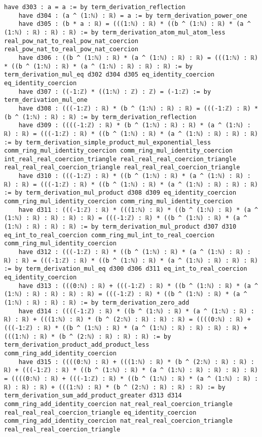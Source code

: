 \documentclass{article}
\begin{document}
\begin{tcolorbox}[colback=white!10, width=\linewidth]
\begin{lstlisting}[language=Lean4]
    have d303 : a = a := by term_derivation_reflection
    have d304 : (a ^ (1:ℕ) : ℝ) = a := by term_derivation_power_one
    have d305 : (b * a : ℝ) = (((1:ℕ) : ℝ) * ((b ^ (1:ℕ) : ℝ) * (a ^ (1:ℕ) : ℝ) : ℝ) : ℝ) := by term_derivation_atom_mul_atom_less real_pow_nat_to_real_pow_nat_coercion real_pow_nat_to_real_pow_nat_coercion
    have d306 : ((b ^ (1:ℕ) : ℝ) * (a ^ (1:ℕ) : ℝ) : ℝ) = (((1:ℕ) : ℝ) * ((b ^ (1:ℕ) : ℝ) * (a ^ (1:ℕ) : ℝ) : ℝ) : ℝ) := by term_derivation_mul_eq d302 d304 d305 eq_identity_coercion eq_identity_coercion
    have d307 : ((-1:ℤ) * ((1:ℕ) : ℤ) : ℤ) = (-1:ℤ) := by term_derivation_mul_one
    have d308 : (((-1:ℤ) : ℝ) * (b ^ (1:ℕ) : ℝ) : ℝ) = (((-1:ℤ) : ℝ) * (b ^ (1:ℕ) : ℝ) : ℝ) := by term_derivation_reflection
    have d309 : ((((-1:ℤ) : ℝ) * (b ^ (1:ℕ) : ℝ) : ℝ) * (a ^ (1:ℕ) : ℝ) : ℝ) = (((-1:ℤ) : ℝ) * ((b ^ (1:ℕ) : ℝ) * (a ^ (1:ℕ) : ℝ) : ℝ) : ℝ) := by term_derivation_simple_product_mul_exponential_less comm_ring_mul_identity_coercion comm_ring_mul_identity_coercion int_real_real_coercion_triangle real_real_real_coercion_triangle real_real_real_coercion_triangle real_real_real_coercion_triangle
    have d310 : (((-1:ℤ) : ℝ) * ((b ^ (1:ℕ) : ℝ) * (a ^ (1:ℕ) : ℝ) : ℝ) : ℝ) = (((-1:ℤ) : ℝ) * ((b ^ (1:ℕ) : ℝ) * (a ^ (1:ℕ) : ℝ) : ℝ) : ℝ) := by term_derivation_mul_product d308 d309 eq_identity_coercion comm_ring_mul_identity_coercion comm_ring_mul_identity_coercion
    have d311 : (((-1:ℤ) : ℝ) * (((1:ℕ) : ℝ) * ((b ^ (1:ℕ) : ℝ) * (a ^ (1:ℕ) : ℝ) : ℝ) : ℝ) : ℝ) = (((-1:ℤ) : ℝ) * ((b ^ (1:ℕ) : ℝ) * (a ^ (1:ℕ) : ℝ) : ℝ) : ℝ) := by term_derivation_mul_product d307 d310 eq_int_to_real_coercion comm_ring_mul_int_to_real_coercion comm_ring_mul_identity_coercion
    have d312 : (((-1:ℤ) : ℝ) * ((b ^ (1:ℕ) : ℝ) * (a ^ (1:ℕ) : ℝ) : ℝ) : ℝ) = (((-1:ℤ) : ℝ) * ((b ^ (1:ℕ) : ℝ) * (a ^ (1:ℕ) : ℝ) : ℝ) : ℝ) := by term_derivation_mul_eq d300 d306 d311 eq_int_to_real_coercion eq_identity_coercion
    have d313 : (((0:ℕ) : ℝ) + (((-1:ℤ) : ℝ) * ((b ^ (1:ℕ) : ℝ) * (a ^ (1:ℕ) : ℝ) : ℝ) : ℝ) : ℝ) = (((-1:ℤ) : ℝ) * ((b ^ (1:ℕ) : ℝ) * (a ^ (1:ℕ) : ℝ) : ℝ) : ℝ) := by term_derivation_zero_add
    have d314 : ((((-1:ℤ) : ℝ) * ((b ^ (1:ℕ) : ℝ) * (a ^ (1:ℕ) : ℝ) : ℝ) : ℝ) + (((1:ℕ) : ℝ) * (b ^ (2:ℕ) : ℝ) : ℝ) : ℝ) = ((((0:ℕ) : ℝ) + (((-1:ℤ) : ℝ) * ((b ^ (1:ℕ) : ℝ) * (a ^ (1:ℕ) : ℝ) : ℝ) : ℝ) : ℝ) + (((1:ℕ) : ℝ) * (b ^ (2:ℕ) : ℝ) : ℝ) : ℝ) := by term_derivation_product_add_product_less comm_ring_add_identity_coercion
    have d315 : ((((0:ℕ) : ℝ) + (((1:ℕ) : ℝ) * (b ^ (2:ℕ) : ℝ) : ℝ) : ℝ) + (((-1:ℤ) : ℝ) * ((b ^ (1:ℕ) : ℝ) * (a ^ (1:ℕ) : ℝ) : ℝ) : ℝ) : ℝ) = ((((0:ℕ) : ℝ) + (((-1:ℤ) : ℝ) * ((b ^ (1:ℕ) : ℝ) * (a ^ (1:ℕ) : ℝ) : ℝ) : ℝ) : ℝ) + (((1:ℕ) : ℝ) * (b ^ (2:ℕ) : ℝ) : ℝ) : ℝ) := by term_derivation_sum_add_product_greater d313 d314 comm_ring_add_identity_coercion nat_real_real_coercion_triangle real_real_real_coercion_triangle eq_identity_coercion comm_ring_add_identity_coercion nat_real_real_coercion_triangle real_real_real_coercion_triangle

\end{lstlisting}
\end{tcolorbox}
\end{document}
